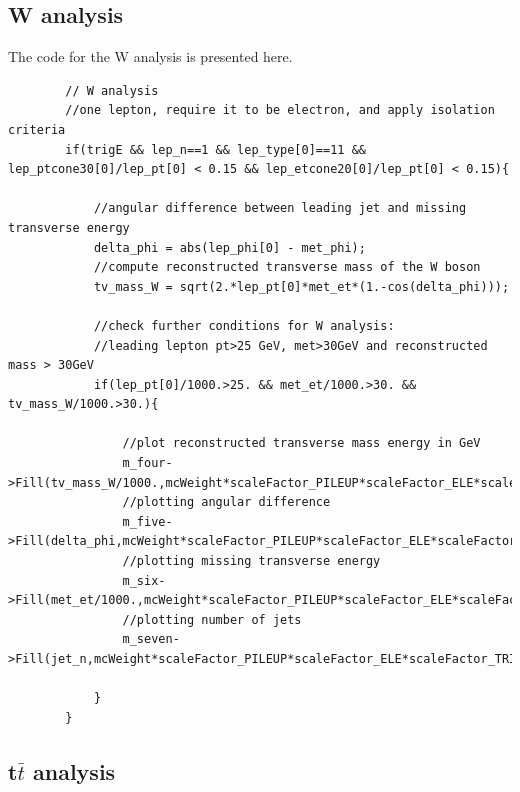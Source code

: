 \documentclass[runningheads,a4paper]{llncs}
\begin{document}
\subsection{W analysis}

\fontsize{7}{5}\selectfont
The code for the W analysis is presented here.
\begin{verbatim}
		// W analysis
		//one lepton, require it to be electron, and apply isolation criteria
		if(trigE && lep_n==1 && lep_type[0]==11 && lep_ptcone30[0]/lep_pt[0] < 0.15 && lep_etcone20[0]/lep_pt[0] < 0.15){

			//angular difference between leading jet and missing transverse energy
			delta_phi = abs(lep_phi[0] - met_phi);
			//compute reconstructed transverse mass of the W boson
			tv_mass_W = sqrt(2.*lep_pt[0]*met_et*(1.-cos(delta_phi))); 

			//check further conditions for W analysis:
			//leading lepton pt>25 GeV, met>30GeV and reconstructed mass > 30GeV
			if(lep_pt[0]/1000.>25. && met_et/1000.>30. && tv_mass_W/1000.>30.){ 
				
				//plot reconstructed transverse mass energy in GeV
				m_four->Fill(tv_mass_W/1000.,mcWeight*scaleFactor_PILEUP*scaleFactor_ELE*scaleFactor_TRIGGER);
				//plotting angular difference
				m_five->Fill(delta_phi,mcWeight*scaleFactor_PILEUP*scaleFactor_ELE*scaleFactor_TRIGGER);
				//plotting missing transverse energy
				m_six->Fill(met_et/1000.,mcWeight*scaleFactor_PILEUP*scaleFactor_ELE*scaleFactor_TRIGGER);
				//plotting number of jets
				m_seven->Fill(jet_n,mcWeight*scaleFactor_PILEUP*scaleFactor_ELE*scaleFactor_TRIGGER);
				
			}
		}
\end{verbatim}
\subsection{t$\bar{t}$ analysis}
\end{document}
